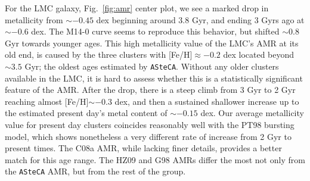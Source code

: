 \documentclass{aa}
\begin{document}
For the LMC galaxy, Fig.~\ref{fig:amr} center plot, we see a marked
drop in metallicity from ${\sim-}0.45$ dex beginning around 3.8 Gyr, and
ending 3 Gyrs ago at ${\sim-}0.6$ dex. The M14-0 curve seems to reproduce this
behavior, but shifted ${\sim}0.8$ Gyr towards younger ages.
%
This high metallicity value of the LMC's AMR at its old end, is
caused by the three clusters with [Fe/H]${\approx-0.2}$ dex located beyond
${\sim}3.5$ Gyr; the oldest ages estimated by \texttt{ASteCA}. Without any older
clusters available in the LMC, it is hard to assess whether this is a
statistically significant feature of the AMR.
%
%
After the drop, there is a steep climb from 3 Gyr to 2 Gyr reaching almost 
[Fe/H]${\sim-}0.3$ dex, and then a sustained shallower increase up
to the estimated present day's metal content of ${\sim-}0.15$ dex.
%
Our average metallicity value for present day clusters coincides reasonably
well with the PT98 bursting model, which shows nonetheless a very different
rate of increase from 2 Gyr to present times. The C08a AMR, while lacking finer
details, provides a better match for this age range.
The HZ09 and G98 AMRs differ the most not only from the \texttt{ASteCA}
AMR, but from the rest of the group.
\end{document}
